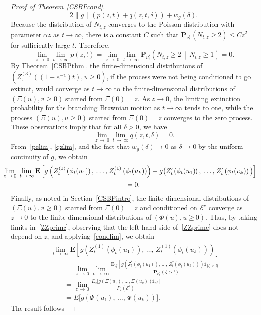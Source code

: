 \documentclass[10pt]{amsart}
\theoremstyle{definition}\newtheorem{defi}[theo]{Definition}\newtheorem{rema}[theo]{Remark}\newtheorem{exam}[theo]{Example}\newtheorem{exem}[theo]{Example}\newtheorem{nota}[theo]{Notation}
\newcommand*\E{\mathbf{E}}
\renewcommand*\P{\mathbf{P}}
\newcommand{\clE}{\mathcal{E}}
\newcommand{\1} {\mathds{1}}
\begin{document}
\begin{proof}[Proof of Theorem~\ref{CSBPcond}]
\[
2 \|g\| (p(z,t) + q(z,t,\delta)) + w_g(\delta).
\]
Because the distribution of $N_{t,z}$ converges to the Poisson distribution with parameter $\alpha z$ as $t \rightarrow \infty$, there is a constant $C$ such that $\P_{\nu_t^*}(N_{t,z} \geq 2) \leq C z^2$ for sufficiently large $t$. Therefore,
\begin{equation}\label{pzlim}
\lim_{z\,\rightarrow\,0} \lim_{t\,\rightarrow\,\infty} p(z,t) = \lim_{z\,\rightarrow\,0} \lim_{t\,\rightarrow\, \infty} \P_{\nu_t^*}\left(N_{t,z} \geq 2 \,\middle|\, N_{t,z} \geq 1\right) = 0.
\end{equation}
By Theorem~\ref{CSBPthm}, the finite-dimensional distributions of $(Z_t^{(3)}((1 - e^{-u})t), u \geq 0)$, if the process were not being conditioned to go extinct, would converge as $t \rightarrow \infty$ to the finite-dimensional distributions of $(\Xi(u), u \geq 0)$ started from $\Xi(0) = z$. As $z \rightarrow 0$, the limiting extinction probability for the branching Brownian motion as $t \rightarrow \infty$ tends to one, while the process $(\Xi(u), u \geq 0)$ started from $\Xi(0) = z$ converges to the zero process. These observations imply that for all $\delta > 0$, we have
\begin{equation}\label{qzlim}
\lim_{z\,\rightarrow\,0} \lim_{t\,\rightarrow\,\infty} q(z,t,\delta) = 0.
\end{equation}
From~\eqref{pzlim}, \eqref{qzlim}, and the fact that $w_g(\delta) \rightarrow 0$ as $\delta \rightarrow 0$ by the uniform continuity of $g$, we obtain
\begin{multline*}
\mkern-20mu\lim_{z\,\rightarrow\,0}\;\lim_{t\,\rightarrow\,\infty} \E\left[g\left(Z_t^{(1)}\left(\phi_t(u_1)\right),\, \dots,\, Z_t^{(1)}\left(\phi_t(u_k)\right)\right) - g\big(Z_t'\left(\phi_t(u_1)\right),\, \dots,\, Z_t'\left(\phi_t(u_k)\right)\big)\right]\\
 = 0.
\end{multline*}
Finally, as noted in Section~\ref{CSBPintro}, the finite-dimensional distributions of $(\Xi(u), u \geq 0)$ started from $\Xi(0) = z$ and conditioned on $\clE^c$ converge as $z \rightarrow 0$ to the finite-dimensional distributions of $(\Phi(u), u \geq 0)$. Thus, by taking limits in~\eqref{ZZprime}, observing that the left-hand side of~\eqref{ZZprime} does not depend on $z$, and applying~\eqref{condlim}, we obtain
\begin{align*}
&\lim_{t\, \rightarrow\,\infty} \E\left[g\left(Z_t^{(1)}\left(\phi_t(u_1)\right),\, \dots,\,Z_t^{(1)}\left(\phi_t(u_k)\right)\right)\right] \\
&\qquad = \lim_{z\,\rightarrow\,0} \lim_{t\,\rightarrow \,\infty} \frac{\E_{\nu_t^*}\left[g\left(Z_t^*\left(\phi_t(u_1)\right),\, \dots,\, Z_t^*\left(\phi_t(u_k)\right)\right) \1_{\{\zeta\,>\,t\}}\right]}{\P_{\nu_t^*}(\zeta > t)} \\
&\qquad = \lim_{z\,\rightarrow\,0} \frac{E_{z}\big[g\left(\Xi(u_1),\, \dots,\, \Xi(u_k)\right) \1_{\clE^c}\big]}{P_{z}\left(\clE^c\right)} \\
&\qquad = E\big[g\left(\Phi(u_1),\, \dots,\, \Phi(u_k)\right)\big].
\end{align*}
The result follows.
\end{proof}
\end{document}

